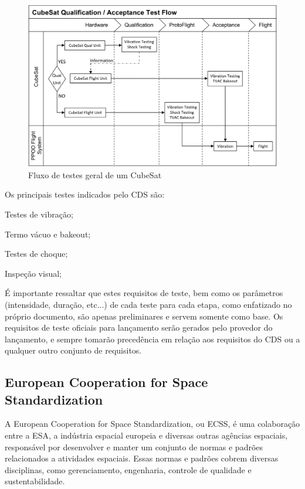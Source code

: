 \begin{figure}[htp]
    \caption{Fluxo de testes geral de um CubeSat}
    \begin{center}
        \includegraphics[width=\textwidth, keepaspectratio]{images/test-flow-diagram-cds.png}
    \end{center}
    \label{fig:test-flow-cds}
\end{figure}

Os principais testes indicados pelo \gls{CDS} são:
\begin{alineas}
    \item Testes de vibração;
    \item Termo vácuo e bakeout;
    \item Testes de choque;
    \item Inspeção visual;
\end{alineas}

É importante ressaltar que estes requisitos de teste, bem como os parâmetros (intensidade, duração, etc...) de cada teste para cada etapa, como enfatizado no próprio documento, são apenas preliminares e servem somente como base. Os requisitos de teste oficiais para lançamento serão gerados pelo provedor do lançamento, e sempre tomarão precedência em relação aos requisitos do \gls{CDS} ou a qualquer outro conjunto de requisitos.


\subsection{European Cooperation for Space Standardization}

A European Cooperation for Space Standardization, ou \gls{ECSS}, é uma colaboração entre a \gls{ESA}, a indústria espacial europeia e diversas outras agências espaciais, responsável por desenvolver e manter um conjunto de normas e padrões relacionados a atividades espaciais. Essas normas e padrões cobrem diversas disciplinas, como gerenciamento, engenharia, controle de qualidade e sustentabilidade.

